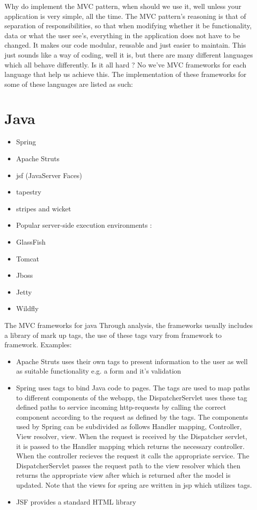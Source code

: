 Why do implement the MVC pattern, when should we use it, well unless your application is very simple, all the time.
The MVC pattern's reasoning is that of separation of responsibilities, so that when modifying whether it be functionality, data or what the user see's, everything in the
application does not have to be changed. It makes our code modular, reusable and just easier to maintain.
This just sounds like a way of coding, well it is, but there are many different languages which all behave differently.
Is it all hard ? No  we've MVC frameworks for each language that help us achieve this. The implementation of these frameworks
for some of these languages are listed as such:

\section{Java}

\begin{itemize}
  \item Spring
  \item Apache Struts
  \item jsf (JavaServer Faces)
  \item tapestry
  \item stripes and wicket
  \item Popular server-side execution environments :
  \item GlassFish
  \item Tomcat
  \item Jboss
  \item Jetty
  \item Wildfly
\end{itemize}

The MVC frameworks for java
Through analysis, the frameworks usually includes a library of mark up tags, the use of these tags vary from framework to framework. Examples:
\begin{itemize}
  \item Apache Struts uses their own tags to present information to the user as well as suitable functionality e.g. a form and it's validation
  \item Spring uses tags to bind Java code to pages. The tags are used to map paths to different components of the webapp, the DispatcherServlet uses these tag defined paths to service incoming http-requests by calling the correct component according to the request as defined by the tags. The components used by Spring can be subdivided as follows Handler mapping, Controller, View resolver, view. When the request is received by the Dispatcher servlet, it is passed to the Handler mapping which returns the necessary controller. When the controller recieves the request it calls the appropriate service. The DispatcherServlet passes the request path to the view resolver which then returns the appropriate view after which is returned after the model is updated. Note that the views for spring are written in jsp which utilizes tags.
  \item JSF provides a standard HTML library
\end{itemize}\par

